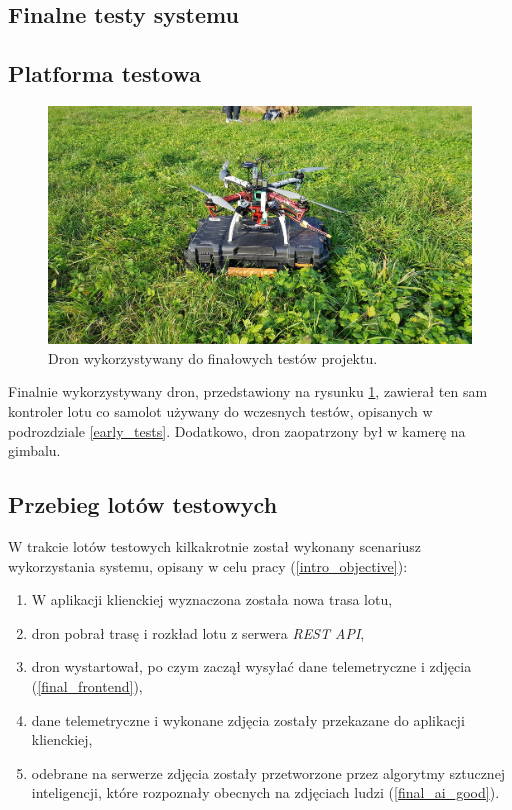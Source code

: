\subsection{Finalne testy systemu}
\subsection{Platforma testowa}
\begin{figure}[H]
	\centering
	\includegraphics[width=0.8\linewidth]{rys05/testing_drone.jpg}
    \caption{
        Dron wykorzystywany do finałowych testów projektu.
    }
	\label{testing_drone}
\end{figure}


Finalnie wykorzystywany dron, przedstawiony na rysunku \ref{testing_drone}, zawierał
ten sam kontroler lotu co samolot używany do wczesnych testów, opisanych w podrozdziale 
\ref{early_tests}. Dodatkowo, dron zaopatrzony był w kamerę na gimbalu.

\subsection{Przebieg lotów testowych}

W trakcie lotów testowych kilkakrotnie został wykonany scenariusz 
wykorzystania systemu, opisany w celu pracy (\ref{intro_objective}):

\begin{enumerate}
    \item W aplikacji klienckiej wyznaczona została nowa trasa lotu,
    \item dron pobrał trasę i rozkład lotu z serwera \textit{REST API},
    \item dron wystartował, po czym zaczął wysyłać dane telemetryczne i zdjęcia (\ref{final_frontend}),
    \item dane telemetryczne i wykonane zdjęcia zostały przekazane do aplikacji klienckiej,
    \item odebrane na serwerze zdjęcia zostały przetworzone przez algorytmy sztucznej inteligencji,
        które rozpoznały obecnych na zdjęciach ludzi (\ref{final_ai_good}).
\end{enumerate}

